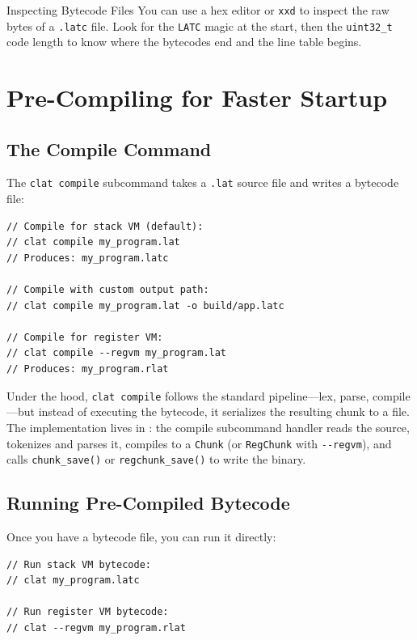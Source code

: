 \begin{tipbox}{Inspecting Bytecode Files}
You can use a hex editor or \lstinline|xxd| to inspect the raw bytes of a \lstinline|.latc| file. Look for the \texttt{LATC} magic at the start, then the \lstinline|uint32_t| code length to know where the bytecodes end and the line table begins.
\end{tipbox}


\section{Pre-Compiling for Faster Startup}\label{sec:precompile}

\subsection{The Compile Command}

The \lstinline|clat compile| subcommand takes a \lstinline|.lat| source file and writes a bytecode file:

\begin{lstlisting}[language=Lattice, caption={Using clat compile}]
// Compile for stack VM (default):
// clat compile my_program.lat
// Produces: my_program.latc

// Compile with custom output path:
// clat compile my_program.lat -o build/app.latc

// Compile for register VM:
// clat compile --regvm my_program.lat
// Produces: my_program.rlat
\end{lstlisting}

Under the hood, \lstinline|clat compile| follows the standard pipeline---lex, parse, compile---but instead of executing the bytecode, it serializes the resulting chunk to a file. The implementation lives in : the compile subcommand handler reads the source, tokenizes and parses it, compiles to a \lstinline|Chunk| (or \lstinline|RegChunk| with \lstinline|--regvm|), and calls \lstinline|chunk_save()| or \lstinline|regchunk_save()| to write the binary.

\subsection{Running Pre-Compiled Bytecode}

Once you have a bytecode file, you can run it directly:

\begin{lstlisting}[language=Lattice, caption={Running pre-compiled bytecode}]
// Run stack VM bytecode:
// clat my_program.latc

// Run register VM bytecode:
// clat --regvm my_program.rlat
\end{lstlisting}

